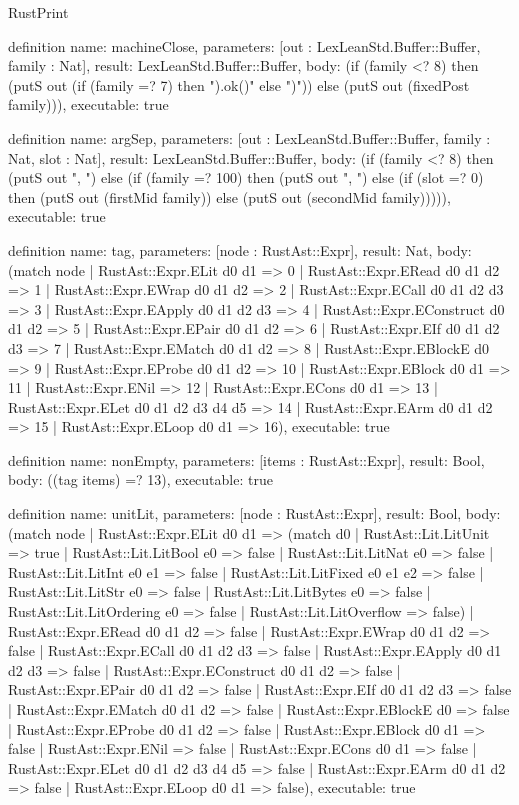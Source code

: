 \begin{lexlean}{RustPrint}
\begin{semanticmodule}
definition{
  name: machineClose,
  parameters: [out : LexLeanStd.Buffer::Buffer, family : Nat],
  result: LexLeanStd.Buffer::Buffer,
  body: (if (family <? 8) then (putS out (if (family =? 7) then ").ok()" else ")")) else (putS out (fixedPost family))),
  executable: true
}

definition{
  name: argSep,
  parameters: [out : LexLeanStd.Buffer::Buffer, family : Nat, slot : Nat],
  result: LexLeanStd.Buffer::Buffer,
  body: (if (family <? 8) then (putS out ", ") else (if (family =? 100) then (putS out ", ") else (if (slot =? 0) then (putS out (firstMid family)) else (putS out (secondMid family))))),
  executable: true
}

definition{
  name: tag,
  parameters: [node : RustAst::Expr],
  result: Nat,
  body: (match node
    | RustAst::Expr.ELit d0 d1 => 0
    | RustAst::Expr.ERead d0 d1 d2 => 1
    | RustAst::Expr.EWrap d0 d1 d2 => 2
    | RustAst::Expr.ECall d0 d1 d2 d3 => 3
    | RustAst::Expr.EApply d0 d1 d2 d3 => 4
    | RustAst::Expr.EConstruct d0 d1 d2 => 5
    | RustAst::Expr.EPair d0 d1 d2 => 6
    | RustAst::Expr.EIf d0 d1 d2 d3 => 7
    | RustAst::Expr.EMatch d0 d1 d2 => 8
    | RustAst::Expr.EBlockE d0 => 9
    | RustAst::Expr.EProbe d0 d1 d2 => 10
    | RustAst::Expr.EBlock d0 d1 => 11
    | RustAst::Expr.ENil => 12
    | RustAst::Expr.ECons d0 d1 => 13
    | RustAst::Expr.ELet d0 d1 d2 d3 d4 d5 => 14
    | RustAst::Expr.EArm d0 d1 d2 => 15
    | RustAst::Expr.ELoop d0 d1 => 16),
  executable: true
}

definition{
  name: nonEmpty,
  parameters: [items : RustAst::Expr],
  result: Bool,
  body: ((tag items) =? 13),
  executable: true
}

definition{
  name: unitLit,
  parameters: [node : RustAst::Expr],
  result: Bool,
  body: (match node
    | RustAst::Expr.ELit d0 d1 => (match d0
      | RustAst::Lit.LitUnit => true
      | RustAst::Lit.LitBool e0 => false
      | RustAst::Lit.LitNat e0 => false
      | RustAst::Lit.LitInt e0 e1 => false
      | RustAst::Lit.LitFixed e0 e1 e2 => false
      | RustAst::Lit.LitStr e0 => false
      | RustAst::Lit.LitBytes e0 => false
      | RustAst::Lit.LitOrdering e0 => false
      | RustAst::Lit.LitOverflow => false)
    | RustAst::Expr.ERead d0 d1 d2 => false
    | RustAst::Expr.EWrap d0 d1 d2 => false
    | RustAst::Expr.ECall d0 d1 d2 d3 => false
    | RustAst::Expr.EApply d0 d1 d2 d3 => false
    | RustAst::Expr.EConstruct d0 d1 d2 => false
    | RustAst::Expr.EPair d0 d1 d2 => false
    | RustAst::Expr.EIf d0 d1 d2 d3 => false
    | RustAst::Expr.EMatch d0 d1 d2 => false
    | RustAst::Expr.EBlockE d0 => false
    | RustAst::Expr.EProbe d0 d1 d2 => false
    | RustAst::Expr.EBlock d0 d1 => false
    | RustAst::Expr.ENil => false
    | RustAst::Expr.ECons d0 d1 => false
    | RustAst::Expr.ELet d0 d1 d2 d3 d4 d5 => false
    | RustAst::Expr.EArm d0 d1 d2 => false
    | RustAst::Expr.ELoop d0 d1 => false),
  executable: true
}


\end{semanticmodule}
\end{lexlean}
